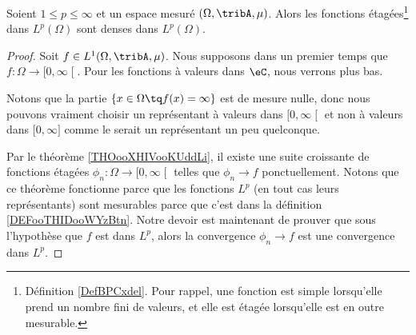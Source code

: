 \begin{proposition}      \label{PROPooUQUBooAWgNhm}
    Soient \( 1\leq p\leq\infty\) et un espace mesuré \( (\Omega,\tribA,\mu)\). Alors les fonctions étagées\footnote{Définition \ref{DefBPCxdel}. Pour rappel, une fonction est simple lorsqu'elle prend un nombre fini de valeurs, et elle est étagée lorsqu'elle est en outre mesurable.} dans \( L^p(\Omega)\) sont denses dans \( L^p(\Omega)\).
\end{proposition}

\begin{proof}
    Soit \( f\in L^1(\Omega,\tribA,\mu)\). Nous supposons dans un premier temps que \( f\colon \Omega\to \mathopen[ 0 , \infty \mathclose[\). Pour les fonctions à valeurs dans \( \eC\), nous verrons plus bas.

    Notons que la partie \( \{ x\in \Omega\tq f(x)=\infty \}\) est de mesure nulle, donc nous pouvons vraiment choisir un représentant à valeurs dans \( \mathopen[ 0 , \infty \mathclose[\) et non à valeurs dans \( \mathopen[ 0 , \infty \mathclose]\) comme le serait un représentant un peu quelconque.

    Par le théorème \ref{THOooXHIVooKUddLi}, il existe une suite croissante de fonctions étagées \( \phi_n\colon \Omega\to \mathopen[ 0 , \infty \mathclose[\) telles que \( \phi_n\to f\) ponctuellement. Notons que ce théorème fonctionne parce que les fonctions \( L^p\) (en tout cas leurs représentants) sont mesurables parce que c'est dans la définition \ref{DEFooTHIDooWYzBtn}.  Notre devoir est maintenant de prouver que sous l'hypothèse que \( f\) est dans \( L^p\), alors la convergence \( \phi_n\to f\) est une convergence dans \( L^p\).


\end{proof}
